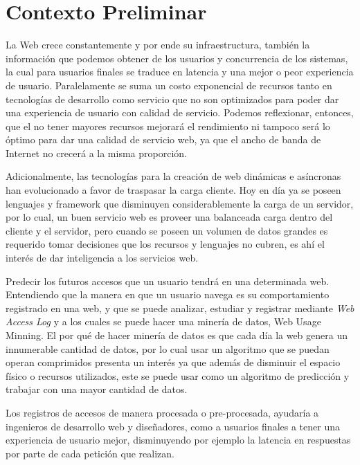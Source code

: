 \section{Contexto Preliminar} 
\label{sec:preliminar}


  La Web crece constantemente y por ende su infraestructura, también la información que podemos obtener de los  usuarios y  concurrencia de los sistemas, la cual para usuarios finales se traduce en latencia y una mejor o peor experiencia de usuario. Paralelamente se suma un costo exponencial de recursos tanto en tecnologías de desarrollo como servicio que no son optimizados para poder dar una experiencia de usuario con calidad de servicio. Podemos reflexionar, entonces, que el no tener mayores recursos mejorará el rendimiento ni tampoco será lo óptimo para dar una calidad de servicio web, ya que el ancho de banda de Internet no crecerá a la misma proporción.
   
  Adicionalmente, las tecnologías para la creación de web dinámicas e asíncronas han evolucionado a favor de traspasar la carga cliente.
  Hoy en día ya se poseen lenguajes y framework que disminuyen considerablemente la carga de un servidor, por lo cual, un buen servicio web es proveer una balanceada carga dentro del cliente y el servidor, pero cuando se poseen un volumen de datos grandes es requerido tomar decisiones que los recursos y lenguajes no cubren, es ahí el interés de dar inteligencia a los servicios web.

  Predecir los futuros accesos que un usuario tendrá en una determinada web. Entendiendo que la manera en que un usuario navega es su comportamiento registrado en una web, y que se puede analizar, estudiar y registrar mediante \emph{Web Access Log} y a los cuales se puede hacer una minería de datos, Web Usage Minning. El por qué de hacer minería de datos es que cada día la web genera un innumerable cantidad de datos, por lo cual usar un algoritmo que se puedan operan comprimidos presenta un interés ya que además de disminuir el espacio físico o recursos utilizados, este se puede usar como un algoritmo de predicción y trabajar con una mayor cantidad de datos.
  
  Los registros de accesos de manera procesada o pre-procesada, ayudaría a ingenieros de desarrollo web y diseñadores, como a  usuarios finales a tener una experiencia de usuario mejor, disminuyendo por ejemplo la latencia en respuestas por parte de cada petición que realizan.
  
